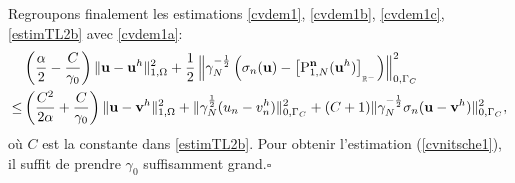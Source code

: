 \documentclass[11pt]{book}
\newcommand{\pf}{\textbf{Preuve : }}
\newcommand{\cqfd}{{$\mbox{}$\hfill$\square$}}
\def\u{{\bf u}}
\def\n{{\bf n}}
\def\vv{{\bf v}}
\def\V{{\bf V}}
\newcommand{\ds}{\displaystyle}
\newcommand{\R}{\mathbb{R}}
\newcommand{\Gc}{\Gamma_{C}}
\newcommand{\dg}{d\Gamma}
\newcommand{\igc}{{\ds\int_{\Gc}\hspace*{-0.7em}}}
\newcommand{\sn}{{\sigma_n}}
\newcommand{\gN}{\gamma_{N}}
\newcommand{\Pgh}{P_{\gamma}}
\newcommand{\PNgh}{\mathrm{P}^{\n}_{1, N}}
\newcommand{\pn}[1]{\left [ #1 \right ]_{_{\R^-}}}
\begin{document}
Regroupons finalement les estimations \eqref{cvdem1}, \eqref{cvdem1b}, \eqref{cvdem1c}, \eqref{estimTL2b} avec \eqref{cvdem1a}:
\begin{align*}
& \left ( \frac\alpha2 - \frac{C}{\gamma_0} \right )  \| \u - \u^h \|^2_{1,\Omega} 
+ \frac{1}{2} \left  \| \gN^{-\frac12} \left (
\sn(\u) - \pn{ \PNgh (\u^h) } \right ) \right \|^2_{0,\Gamma_C} \nonumber \\
\leq & \left ( \frac{C^2}{2\alpha}+ \frac{C}{\gamma_0} \right ) \| \u - \vv^h \|^2_{1,\Omega}
+  \| \gN^{\frac12} ( u_n - v^h_n  ) \|^2_{0,\Gamma_C}
+ (C+ 1)
\| \gN^{-\frac12} \sn(\u - \vv^h) \|^2_{0,\Gamma_C},
\end{align*}
où $C$ est la constante dans \eqref{estimTL2b}.
Pour obtenir l'estimation (\ref{cvnitsche1}), il suffit de prendre $\gamma_0$ suffisamment grand.\cqfd
% 
\end{document}

